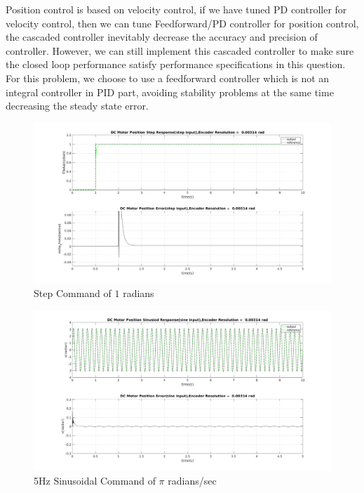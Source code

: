 \documentclass[letterpaper]{article}
\begin{document}
Position control is based on velocity control, if we have tuned PD controller for velocity control, then we can tune Feedforward/PD controller for position control, the cascaded controller inevitably decrease the accuracy and precision of controller. However, we can still implement this cascaded controller to make sure the closed loop performance satisfy performance specifications in this question. For this problem, we choose to use a feedforward controller which is not an integral controller in PID part, avoiding stability problems at the same time decreasing the steady state error.

\begin{figure}[H]
\begin{center}
\includegraphics[scale=0.3]{position_step.png}
\caption{Step Command of $1$ radians}
\label{q3_18}
\end{center}
\end{figure}

\begin{figure}[H]
\begin{center}
\includegraphics[scale=0.3]{position_sine.png}
\caption{5Hz Sinusoidal Command of $\pi$ radians/sec}
\label{q3_19}
\end{center}
\end{figure}
\end{document}

